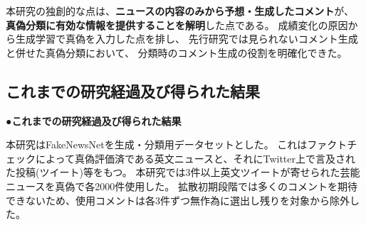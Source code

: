 {	本研究の独創的な点は、\textbf{ニュースの内容のみから予想・⽣成したコメント}が、
	\textbf{真偽分類に有効な情報を提供することを解明}した点である。
	成績変化の原因から生成学習で真偽を入力した点を排し、
	先行研究では見られないコメント生成と併せた真偽分類において、
	分類時のコメント生成の役割を明確化できた。
	


	\subsection{これまでの研究経過及び得られた結果}
	\noindent
	●\textbf{これまでの研究経過及び得られた結果}

	本研究はFakeNewsNet\cite{Shu2018FakeNewsNetAD, shu2017fake}を生成・分類用データセットとした。
	これはファクトチェックによって真偽評価済である英文ニュースと、それにTwitter上で言及された投稿(ツイート)等をもつ。
	本研究では3件以上英文ツイートが寄せられた芸能ニュースを真偽で各2000件使用した。
	拡散初期段階では多くのコメントを期待できないため、使用コメントは各3件ずつ無作為に選出し残りを対象から除外した。

}
